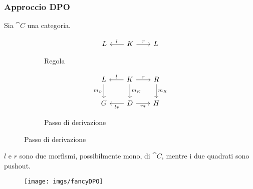 \documentclass[8pt]{beamer}
\begin{document}
\begin{frame}[fragile]\frametitle{Approccio DPO}
	Sia $\cat C$ una categoria.
	\begin{figure}[h]
		\begin{subfigure}{0.25\textwidth}
			\[\begin{tikzcd}[row sep = 20, column sep = 20] L & K \arrow[r, "r"] \arrow[l, "l"swap] & L \end{tikzcd}\]
		\label{fig:rule}
		\caption{Regola}
		\end{subfigure}
		\qquad
		\begin{subfigure}{0.25\textwidth}
			\[\begin{tikzcd}[row sep = 20, column sep = 20]
			L \arrow[d, "{m_L}"swap] & K\arrow[d, "{m_K}"] \arrow[r, "r"] \arrow[l, "l"swap] & R \arrow[d, "{m_R}"] \\
				G & D \arrow[l, "{l*}"] \arrow[r, "{r*}"swap] & H
		\end{tikzcd}\]
		\caption{Passo di derivazione}
		\label{fig:step}
		\end{subfigure}
	\end{figure}
	$l$ e $r$ sono due morfismi, possibilmente mono, di $\cat C$, 
	mentre i due quadrati sono pushout.


	\begin{figure}
		\texttt{[image: imgs/fancyDPO]}
	\end{figure}
\end{frame}
\end{document}
